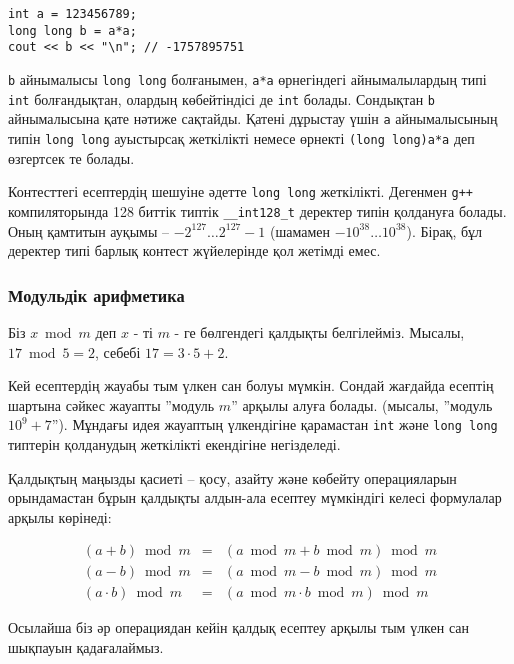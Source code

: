 \begin{lstlisting}
int a = 123456789;
long long b = a*a;
cout << b << "\n"; // -1757895751
\end{lstlisting}

\texttt{b} айнымалысы \texttt{long long} болғанымен,
\texttt{a*a} өрнегіндегі айнымалылардың типі \texttt{int}
болғандықтан, олардың көбейтіндісі де \texttt{int} болады.
Сондықтан \texttt{b} айнымалысына қате нәтиже сақтайды.
Қатені дұрыстау үшін \texttt{a} айнымалысының типін
\texttt{long long} ауыстырсақ жеткілікті немесе 
өрнекті \texttt{(long long)a*a} деп өзгертсек те болады.

Контесттегі есептердің шешуіне әдетте \texttt{long long} 
жеткілікті. Дегенмен \texttt{g++} компиляторында 
128 биттік типтік \texttt{\_\_int128\_t} деректер типін
қолдануға болады. Оның қамтитын ауқымы --
$-2^{127} \ldots 2^{127}-1$ (шамамен $-10^{38} \ldots 10^{38}$).
Бірақ, бұл деректер типі барлық контест
жүйелерінде қол жетімді емес.

\subsubsection{Модульдік арифметика}


Біз $x \bmod m$ деп $x$ - ті $m$ - ге 
бөлгендегі қалдықты белгілейміз.
Мысалы, $17 \bmod 5 = 2$,
себебі $17 = 3 \cdot 5 + 2$.

Кей есептердің жауабы тым үлкен сан болуы мүмкін. Сондай жағдайда есептің шартына сәйкес жауапты ''модуль $m$'' арқылы алуға болады. 
(мысалы, ''модуль $10^9+7$'').
Мұндағы идея жауаптың үлкендігіне қарамастан 
\texttt{int} және \texttt{long long} типтерін қолданудың жеткілікті екендігіне негізделеді.

Қалдықтың маңызды қасиеті -- 
қосу, азайту және көбейту
операцияларын орындамастан 
бұрын қалдықты алдын-ала есептеу мүмкіндігі келесі формулалар арқылы көрінеді:

\[
\begin{array}{rcr}
(a+b) \bmod m & = & (a \bmod m + b \bmod m) \bmod m \\
(a-b) \bmod m & = & (a \bmod m - b \bmod m) \bmod m \\
(a \cdot b) \bmod m & = & (a \bmod m \cdot b \bmod m) \bmod m
\end{array}
\]

Осылайша біз әр операциядан кейін қалдық есептеу арқылы
тым үлкен сан шықпауын қадағалаймыз.

